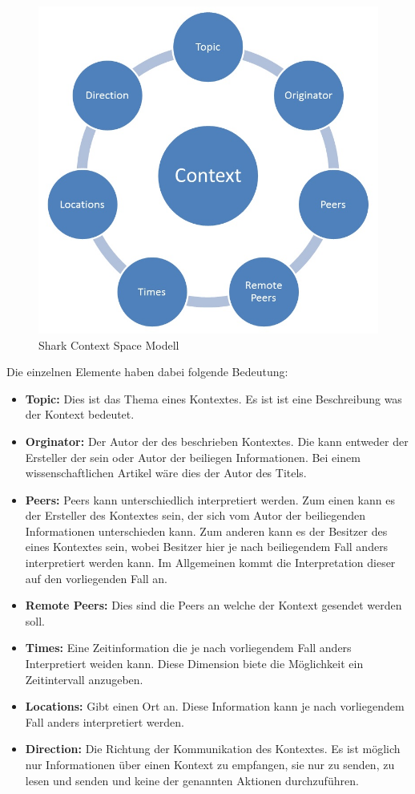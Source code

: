 \documentclass[a4paper]{article}
\begin{document}
	\begin{figure}[H] 
		\includegraphics[width=\linewidth]{../Bilder/contextspace.jpg}
		\caption{Shark Context Space Modell}
		\label{fig:CSModel}
	\end{figure}
	
	Die einzelnen Elemente haben dabei folgende Bedeutung:
	\begin{itemize}
		\item \textbf{Topic:} Dies ist das Thema eines Kontextes. Es ist ist eine
		Beschreibung was der Kontext bedeutet.
		\item \textbf{Orginator:} Der Autor der des beschrieben Kontextes. Die
		kann entweder der Ersteller der sein oder Autor der beiliegen
		Informationen. Bei einem wissenschaftlichen Artikel wäre dies der Autor
		des Titels.
		\item \textbf{Peers:} Peers kann unterschiedlich interpretiert werden.
		Zum einen kann es der Ersteller des Kontextes sein, der sich vom Autor
		der beiliegenden Informationen unterschieden kann. Zum anderen kann es
		der Besitzer des eines Kontextes sein, wobei Besitzer hier je nach 
		beiliegendem Fall anders interpretiert werden kann. Im Allgemeinen
		kommt die Interpretation dieser auf den vorliegenden Fall an.
		\item \textbf{Remote Peers:} Dies sind die Peers an welche der Kontext
		gesendet werden soll.
		\item \textbf{Times:} Eine Zeitinformation die je nach vorliegendem Fall
		anders Interpretiert weiden kann. Diese Dimension biete die Möglichkeit
		ein Zeitintervall anzugeben.
		\item \textbf{Locations:} Gibt einen Ort an. Diese Information kann je
		nach vorliegendem Fall anders interpretiert werden.
		\item \textbf{Direction:} Die Richtung der Kommunikation des Kontextes.
		Es ist möglich nur Informationen über einen Kontext zu empfangen, sie nur
		zu senden, zu lesen und senden und keine der genannten Aktionen
		durchzuführen.
	\end{itemize} 	
	
\end{document}
